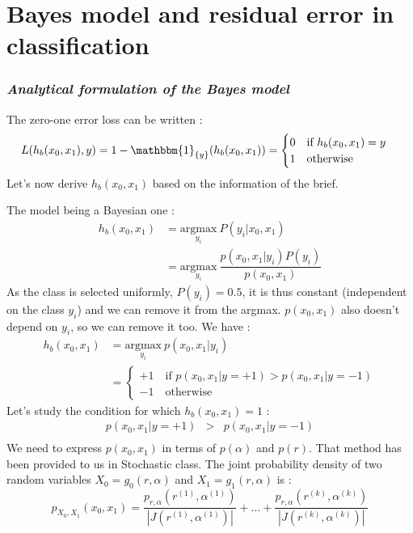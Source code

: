 \section{Bayes model and residual error in classification}

\subsubsection{{\it Analytical formulation of the Bayes model}}
The zero-one error loss can be written :
$$
L(h_b(x_0, x_1), y) = 1 - \mathbbm{1}_{\{y\}}(h_b(x_0, x_1)) = \begin{cases}
    0 \quad \text{if }h_b(x_0, x_1) = y\\
    1 \quad \text{otherwise} \\
\end{cases}
$$ 
Let's now derive $h_b(x_0, x_1)$ based on the information of the brief.\par
The model being a Bayesian one :
\begin{align*}
    h_b(x_0, x_1) &= \underset{y_i}{\mathrm{argmax}}\ P(y_i | x_0, x_1)\\
    &= \underset{y_i}{\mathrm{argmax}}\ \dfrac{p(x_0, x_1 | y_i) P(y_i)}{p(x_0, x_1)}
\end{align*}
As the class is selected uniformly, $P(y_i) = \num{0.5}$, it is thus constant (independent on the class $y_i$) and we can remove it from the argmax. $p(x_0, x_1)$ also doesn't depend on $y_i$, so we can remove it too. We have :
\begin{align*}
    h_b(x_0, x_1) &= \underset{y_i}{\mathrm{argmax}}\ p(x_0, x_1 | y_i)\\
    &= \begin{cases}
        +1 \quad \text{if }p(x_0, x_1 | y=+1) > p(x_0, x_1 | y=-1)\\
        -1 \quad \text{otherwise}
    \end{cases}
\end{align*}
Let's study the condition for which $h_b(x_0, x_1) = 1$ :
$$
\begin{array}{ccc}
    p(x_0, x_1 | y=+1) & > &  p(x_0, x_1 | y=-1) \\
\end{array}
$$
We need to express $p(x_0, x_1)$ in terms of $p(\alpha)$ and $p(r)$. That method has been provided to us in Stochastic class. The joint probability density of two random variables $X_0 = g_0(r, \alpha)$ and $X_1 = g_1(r, \alpha)$ is :
$$
p_{X_0, X_1}(x_0, x_1) = \dfrac{p_{r, \alpha}(r^{(1)}, \alpha^{(1)})}{|J(r^{(1)}, \alpha^{(1)})|} + ... + \dfrac{p_{r, \alpha}(r^{(k)}, \alpha^{(k)})}{|J(r^{(k)}, \alpha^{(k)})|}
$$
